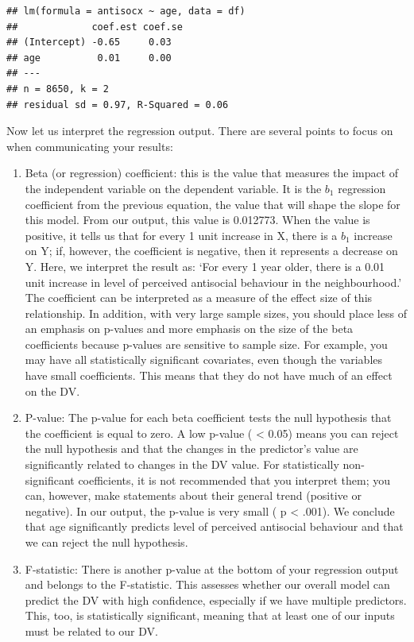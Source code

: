 \documentclass[
]{book}
\begin{document}
\begin{verbatim}
## lm(formula = antisocx ~ age, data = df)
##             coef.est coef.se
## (Intercept) -0.65     0.03  
## age          0.01     0.00  
## ---
## n = 8650, k = 2
## residual sd = 0.97, R-Squared = 0.06
\end{verbatim}

Now let us interpret the regression output. There are several points to focus on when communicating your results:

\begin{enumerate}
\def\labelenumi{\arabic{enumi}.}
\item
  Beta (or regression) coefficient: this is the value that measures the impact of the independent variable on the dependent variable. It is the \(b_1\) regression coefficient from the previous equation, the value that will shape the slope for this model. From our output, this value is 0.012773. When the value is positive, it tells us that for every 1 unit increase in X, there is a \(b_1\) increase on Y; if, however, the coefficient is negative, then it represents a decrease on Y. Here, we interpret the result as: `For every 1 year older, there is a 0.01 unit increase in level of perceived antisocial behaviour in the neighbourhood.' The coefficient can be interpreted as a measure of the effect size of this relationship. In addition, with very large sample sizes, you should place less of an emphasis on p-values and more emphasis on the size of the beta coefficients because p-values are sensitive to sample size. For example, you may have all statistically significant covariates, even though the variables have small coefficients. This means that they do not have much of an effect on the DV.
\item
  P-value: The p-value for each beta coefficient tests the null hypothesis that the coefficient is equal to zero. A low p-value ( \textless{} 0.05) means you can reject the null hypothesis and that the changes in the predictor's value are significantly related to changes in the DV value. For statistically non-significant coefficients, it is not recommended that you interpret them; you can, however, make statements about their general trend (positive or negative). In our output, the p-value is very small ( p \textless{} .001). We conclude that age significantly predicts level of perceived antisocial behaviour and that we can reject the null hypothesis.
\item
  F-statistic: There is another p-value at the bottom of your regression output and belongs to the F-statistic. This assesses whether our overall model can predict the DV with high confidence, especially if we have multiple predictors. This, too, is statistically significant, meaning that at least one of our inputs must be related to our DV.

\end{enumerate}
\end{document}
